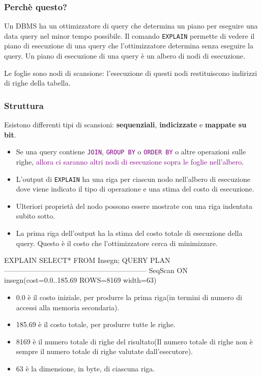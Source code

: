 \subsubsection*{Perchè questo?}
Un DBMS ha un ottimizzatore di query che determina un piano per eseguire una data query nel minor tempo possibile.
Il comando \texttt{EXPLAIN} permette di vedere il piano di esecuzione di una query che l’ottimizzatore determina senza eseguire la query.
Un piano di esecuzione di una query è un albero di nodi di esecuzione.

Le foglie sono nodi di scansione: l’esecuzione di questi nodi restituiscono indirizzi di righe della tabella.

\subsubsection*{Struttura}

Esistono differenti tipi di scansioni: \textbf{sequenziali}, \textbf{indicizzate} e \textbf{mappate su bit}.
\begin{itemize}
  \item Se una query contiene \texttt{\textcolor{purple}{JOIN}}, \texttt{\textcolor{purple}{GROUP BY}} o \texttt{\textcolor{purple}{ORDER BY}} o altre operazioni sulle righe, \textcolor{purple}{allora ci saranno altri nodi di esecuzione sopra le foglie nell’albero}.
  \item L’output di \texttt{EXPLAIN} ha una riga per ciascun nodo nell’albero di esecuzione dove viene indicato il tipo di operazione e una stima del costo di esecuzione.
  \item Ulteriori proprietà del nodo possono essere mostrate con una riga indentata subito sotto.
  \item La prima riga dell’output ha la stima del costo totale di esecuzione della query. Questo è il costo che l’ottimizzatore cerca di minimizzare.
\end{itemize} 

\begin{codiceSQL}
EXPLAIN SELECT* FROM Insegn;
QUERY PLAN
------------------------------------------------------------
SeqScan ON insegn(cost=0.0..185.69 ROWS=8169 width=63)  
\end{codiceSQL}
\begin{itemize}
  \item 0.0 è il costo iniziale, per produrre la prima riga(in termini di numero di accessi alla memoria secondaria).
  \item 185.69 è il costo totale, per produrre tutte le righe.
  \item 8169 è il numero totale di righe del risultato(Il numero totale di righe non è sempre il numero totale di righe valutate dall’esecutore).
  \item 63 è la dimensione, in byte, di ciascuna riga.
\end{itemize}

